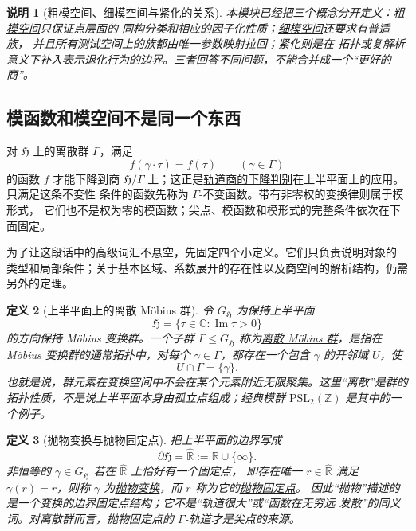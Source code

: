 \documentclass[UTF8,fontset=none,a4paper,11pt]{ctexart}
\theoremstyle{foundation-definition}
\newtheorem{definition}{定义}[section]
\theoremstyle{foundation-theorem}
\theoremstyle{foundation-proposition}
\theoremstyle{foundation-example}
\theoremstyle{foundation-remark}
\newtheorem{remark}[definition]{说明}
\theoremstyle{foundation-theorem}
\newcommand{\term}[2]{\hyperref[#1]{#2}}
\begin{document}
\begin{remark}[粗模空间、细模空间与紧化的关系]\label{rem:coarse-fine-compactification}
本模块已经把三个概念分开定义：\term{def:coarse-moduli-space}{粗模空间}只保证点层面的
同构分类和相应的因子化性质；\term{def:fine-moduli-space}{细模空间}还要求有普适族，
并且所有测试空间上的族都由唯一参数映射拉回；\term{def:compactification}{紧化}则是在
拓扑或复解析意义下补入表示退化行为的边界。三者回答不同问题，不能合并成一个“更好的商”。
\end{remark}

\subsection{模函数和模空间不是同一个东西}

对 \(\mathfrak H\) 上的离散群 \(\Gamma\)，满足
\[
f(\gamma\cdot\tau)=f(\tau)
\qquad(\gamma\in\Gamma)
\]
的函数 \(f\) 才能下降到商 \(\mathfrak H/\Gamma\) 上；这正是\term{prop:orbit-quotient-descent}{轨道商的下降判别}在上半平面上的应用。只满足这条不变性
条件的函数先称为 \(\Gamma\)-不变函数。带有非零权的变换律则属于模形式，
它们也不是权为零的模函数；尖点、模函数和模形式的完整条件依次在下面固定。

为了让这段话中的高级词汇不悬空，先固定四个小定义。它们只负责说明对象的
类型和局部条件；关于基本区域、系数展开的存在性以及商空间的解析结构，仍需
另外的定理。

\begin{definition}[上半平面上的离散 Möbius 群]\label{def:discrete-mobius-group}
令 \(G_{\mathfrak H}\) 为保持上半平面
\[
\mathfrak H=\{\tau\in\mathbb C:\operatorname{Im}\tau>0\}
\]
的方向保持 Möbius 变换群。一个子群 \(\Gamma\leq G_{\mathfrak H}\) 称为\term{def:discrete-mobius-group}{离散 Möbius 群}，是指在 Möbius 变换群的通常拓扑中，对每个
\(\gamma\in\Gamma\)，都存在一个包含 \(\gamma\) 的开邻域 \(U\)，使
\[
U\cap\Gamma=\{\gamma\}.
\]
也就是说，群元素在变换空间中不会在某个元素附近无限聚集。这里“离散”是群的
拓扑性质，不是说上半平面本身由孤立点组成；经典模群
\(\mathrm{PSL}_2(\mathbb Z)\) 是其中的一个例子。
\end{definition}

\begin{definition}[抛物变换与抛物固定点]\label{def:parabolic-fixed-point}
把上半平面的边界写成
\[
\partial\mathfrak H=\widehat{\mathbb R}:=\mathbb R\cup\{\infty\}.
\]
非恒等的 \(\gamma\in G_{\mathfrak H}\) 若在 \(\widehat{\mathbb R}\) 上恰好有一个固定点，
即存在唯一 \(r\in\widehat{\mathbb R}\) 满足 \(\gamma(r)=r\)，则称 \(\gamma\) 为\term{def:parabolic-fixed-point}{抛物变换}，而 \(r\) 称为它的\term{def:parabolic-fixed-point}{抛物固定点}。
因此“抛物”描述的是一个变换的边界固定点结构；它不是“轨道很大”或“函数在无穷远
发散”的同义词。对离散群而言，抛物固定点的 \(\Gamma\)-轨道才是尖点的来源。
\end{definition}
\end{document}
